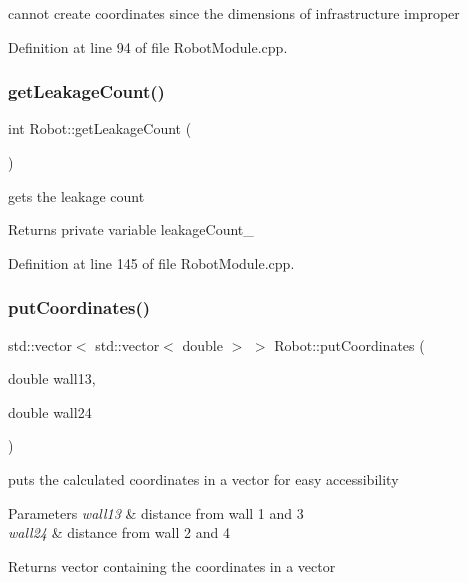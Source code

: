 cannot create coordinates since the dimensions of infrastructure improper 

Definition at line 94 of file Robot\+Module.\+cpp.

\mbox{\label{class_robot_a96b474911213f373d2928f59e77a0fde}} 
\subsubsection{\texorpdfstring{get\+Leakage\+Count()}{getLeakageCount()}}
{\footnotesize\ttfamily int Robot\+::get\+Leakage\+Count (\begin{DoxyParamCaption}{ }\end{DoxyParamCaption})}



gets the leakage count 

\begin{DoxyReturn}{Returns}
private variable leakage\+Count\+\_\+ 
\end{DoxyReturn}


Definition at line 145 of file Robot\+Module.\+cpp.

\mbox{\label{class_robot_aac72211bc05d19f5e219d561bf47f73f}} 
\subsubsection{\texorpdfstring{put\+Coordinates()}{putCoordinates()}}
{\footnotesize\ttfamily std\+::vector$<$ std\+::vector$<$ double $>$ $>$ Robot\+::put\+Coordinates (\begin{DoxyParamCaption}\item[{double}]{wall13,  }\item[{double}]{wall24 }\end{DoxyParamCaption})}



puts the calculated coordinates in a vector for easy accessibility 


\begin{DoxyParams}{Parameters}
{\em wall13} & distance from wall 1 and 3\\
\hline
{\em wall24} & distance from wall 2 and 4\\
\hline
\end{DoxyParams}
\begin{DoxyReturn}{Returns}
vector containing the coordinates in a vector 
\end{DoxyReturn}



